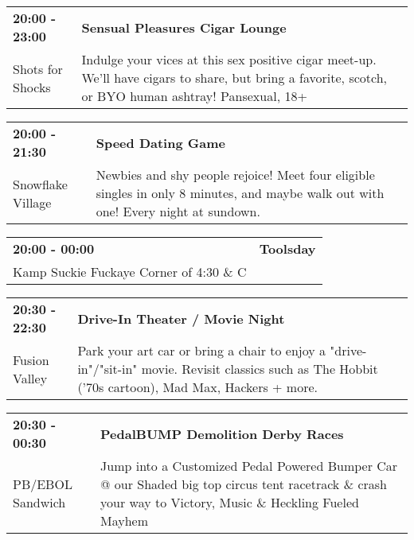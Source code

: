 \begin{tabular}{ p{1in} p{2.2in} }
    \textbf{20:00 - 23:00} & \textbf{Sensual Pleasures Cigar Lounge} \\
    Shots for Shocks \newline  & Indulge your vices at this sex positive cigar meet-up. We'll have cigars to share, but bring a favorite, scotch, or BYO human ashtray! Pansexual, 18+ \\
    \hline 
\end{tabular}
    
\begin{tabular}{ p{1in} p{2.2in} }
    \textbf{20:00 - 21:30} & \textbf{Speed Dating Game} \\
    Snowflake Village \newline  & Newbies and shy people rejoice! Meet four eligible singles in only 8 minutes, and maybe walk out with one! Every night at sundown. \\
    \hline 
\end{tabular}
    
\begin{tabular}{ p{1in} p{2.2in} }
    \textbf{20:00 - 00:00} & \textbf{Toolsday} \\
    Kamp Suckie Fuckaye \newline Corner of 4:30 \& C &  \\
    \hline 
\end{tabular}
    
\begin{tabular}{ p{1in} p{2.2in} }
    \textbf{20:30 - 22:30} & \textbf{Drive-In Theater / Movie Night} \\
    Fusion Valley \newline  & Park your art car or bring a chair to enjoy a "drive-in"/"sit-in" movie. Revisit classics such as The Hobbit ('70s cartoon), Mad Max, Hackers + more. \\
    \hline 
\end{tabular}
    
\begin{tabular}{ p{1in} p{2.2in} }
    \textbf{20:30 - 00:30} & \textbf{PedalBUMP Demolition Derby Races} \\
    PB/EBOL Sandwich \newline  & Jump into a Customized Pedal Powered Bumper Car @ our Shaded big top circus tent racetrack \& crash your way to Victory, Music \& Heckling Fueled Mayhem \\
    \hline 
\end{tabular}
    
